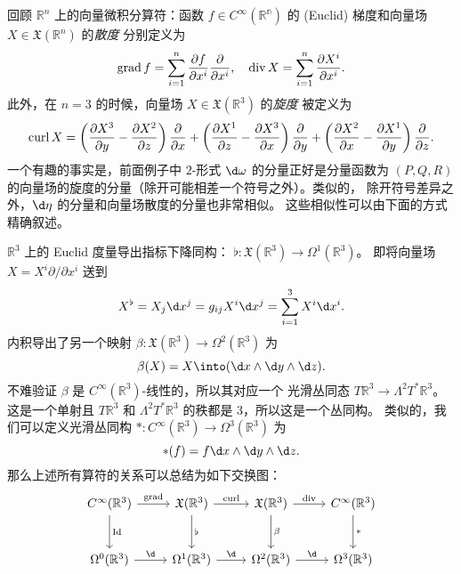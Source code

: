 回顾 $\mathbb{R}^n$ 上的向量微积分算符：函数 $f\in C^\infty(\mathbb{R^n})$
的 (Euclid) 梯度和向量场 $X\in \mathfrak{X}(\mathbb{R}^n)$ 的\emph{散度}
分别定义为
\begin{equation}
  \operatorname{grad} f=\sum_{i=1}^n\frac{\partial f}{\partial x^i}\frac{\partial}{\partial x^i},\quad 
  \operatorname{div} X=\sum_{i=1}^n\frac{\partial X^i}{\partial x^i}.
\end{equation}
此外，在 $n=3$ 的时候，向量场 $X\in \mathfrak{X}(\mathbb{R}^3)$ 的\emph{旋度}
被定义为
\[
  \operatorname{curl} X=\left(\frac{\partial X^3}{\partial y}-\frac{\partial X^2}{\partial z}\right)
  \frac{\partial}{\partial x}+  \left(\frac{\partial X^1}{\partial z}-\frac{\partial X^3}{\partial x}\right)
  \frac{\partial}{\partial y}+
  \left(\frac{\partial X^2}{\partial x}-\frac{\partial X^1}{\partial y}\right)
  \frac{\partial}{\partial z}.
\]
一个有趣的事实是，前面例子中 $2$-形式 $\d\omega$ 的分量正好是分量函数为
$(P,Q,R)$ 的向量场的旋度的分量（除开可能相差一个符号之外）。类似的，
除开符号差异之外，$\d\eta$ 的分量和向量场散度的分量也非常相似。
这些相似性可以由下面的方式精确叙述。

$\mathbb{R}^3$ 上的 Euclid 度量导出指标下降同构：
$\flat:\mathfrak{X}(\mathbb{R}^3)\to \Omega^1(\mathbb{R}^3)$。
即将向量场 $X=X^i\partial/\partial x^i$ 送到
\[
  X^\flat=X_j\d x^j=g_{ij}X^i\d x^j=\sum_{i=1}^3 X^i\d x^i.
\]
内积导出了另一个映射 $\beta:\mathfrak{X}(\mathbb{R}^3)\to \Omega^2(\mathbb{R}^3)$
为
\begin{equation}
  \beta(X)=X\into (\d x\wedge\d y\wedge \d z).
\end{equation}
不难验证 $\beta$ 是 $C^\infty(\mathbb{R}^3)$-线性的，所以其对应一个
光滑丛同态 $T \mathbb{R}^3\to \Lambda^2T^*\mathbb{R}^3$。这是一个单射且
$T \mathbb{R}^3$ 和 $\Lambda^2T^*\mathbb{R}^3$ 的秩都是 $3$，所以这是一个丛同构。
类似的，我们可以定义光滑丛同构 $*:C^\infty(\mathbb{R}^3)\to \Omega^3(\mathbb{R}^3)$
为
\begin{equation}
  *(f)=f\d x\wedge\d y\wedge\d z.
\end{equation}
那么上述所有算符的关系可以总结为如下交换图：
\begin{equation}
  \begin{tikzcd}[row sep=large]
    C^\infty(\mathbb{R}^3)\arrow[r,"\grad"]\arrow[d,"\Id"]
    & \mathfrak{X}(\mathbb{R}^3)\arrow[r,"\curl"]\arrow[d,"\flat"]
    & \mathfrak{X}(\mathbb{R}^3)\arrow[r,"\dive"]\arrow[d,"\beta"]
    & C^\infty(\mathbb{R}^3)\arrow[d,"*"]
    \\
    \Omega^0(\mathbb{R}^3)\arrow[r,"\d"] & 
    \Omega^1(\mathbb{R}^3)\arrow[r,"\d"] & 
    \Omega^2(\mathbb{R}^3)\arrow[r,"\d"] & 
    \Omega^3(\mathbb{R}^3)
  \end{tikzcd}
\end{equation}

